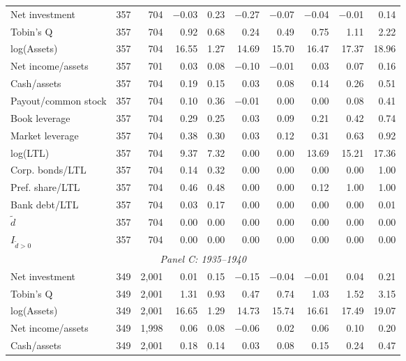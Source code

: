 \begin{table}[p]
\begin{threeparttable}
\begin{tabular}{lrrrrrrrrr}
            \midrule
            Net investment & 357 & 704 & $-$0.03 & 0.23 & $-$0.27 & $-$0.07 & $-$0.04 & $-$0.01 & 0.14 \\
            Tobin's Q & 357 & 704 & 0.92 & 0.68 & 0.24 & 0.49 & 0.75 & 1.11 & 2.22 \\
            log(Assets) & 357 & 704 & 16.55 & 1.27 & 14.69 & 15.70 & 16.47 & 17.37 & 18.96 \\
            Net income/assets & 357 & 701 & 0.03 & 0.08 & $-$0.10 & $-$0.01 & 0.03 & 0.07 & 0.16 \\
            Cash/assets & 357 & 704 & 0.19 & 0.15 & 0.03 & 0.08 & 0.14 & 0.26 & 0.51 \\
            Payout/common stock & 357 & 704 & 0.10 & 0.36 & $-$0.01 & 0.00 & 0.00 & 0.08 & 0.41 \\
            Book leverage & 357 & 704 & 0.29 & 0.25 & 0.03 & 0.09 & 0.21 & 0.42 & 0.74 \\
            Market leverage & 357 & 704 & 0.38 & 0.30 & 0.03 & 0.12 & 0.31 & 0.63 & 0.92 \\
            log(LTL) & 357 & 704 & 9.37 & 7.32 & 0.00 & 0.00 & 13.69 & 15.21 & 17.36 \\
            Corp. bonds/LTL & 357 & 704 & 0.14 & 0.32 & 0.00 & 0.00 & 0.00 & 0.00 & 1.00 \\
            Pref. share/LTL & 357 & 704 & 0.46 & 0.48 & 0.00 & 0.00 & 0.12 & 1.00 & 1.00 \\
            Bank debt/LTL & 357 & 704 & 0.03 & 0.17 & 0.00 & 0.00 & 0.00 & 0.00 & 0.01 \\
            \ensuremath{\tilde{d}} & 357 & 704 & 0.00 & 0.00 & 0.00 & 0.00 & 0.00 & 0.00 & 0.00 \\
            \ensuremath{I_{\tilde{d}>0}} & 357 & 704 & 0.00 & 0.00 & 0.00 & 0.00 & 0.00 & 0.00 & 0.00 \\
            \midrule
            \multicolumn{10}{c}{\textit{Panel C: 1935--1940}} \\
            \midrule
            Net investment & 349 & 2,001 & 0.01 & 0.15 & $-$0.15 & $-$0.04 & $-$0.01 & 0.04 & 0.21 \\
            Tobin's Q & 349 & 2,001 & 1.31 & 0.93 & 0.47 & 0.74 & 1.03 & 1.52 & 3.15 \\
            log(Assets) & 349 & 2,001 & 16.65 & 1.29 & 14.73 & 15.74 & 16.61 & 17.49 & 19.07 \\
            Net income/assets & 349 & 1,998 & 0.06 & 0.08 & $-$0.06 & 0.02 & 0.06 & 0.10 & 0.20 \\
            Cash/assets & 349 & 2,001 & 0.18 & 0.14 & 0.03 & 0.08 & 0.15 & 0.24 & 0.47 \\

\end{tabular}
\end{threeparttable}
\end{table}
